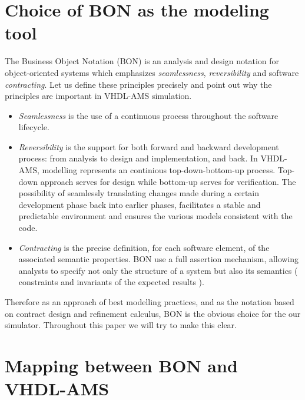 \documentclass{article}
\newcommand{\todo}{\textbf{TODO:}}
\begin{document}
\section{Choice of BON as the modeling tool}
The Business Object Notation (BON) is an analysis and design notation 
for object-oriented systems  which emphasizes \emph{seamlessness}, 
\emph{reversibility} and software \emph{contracting}. Let us define 
these principles precisely and point out why the principles are 
important in VHDL-AMS simulation.
\begin{itemize}
\item \emph{Seamlessness} is the use of a continuous process 
throughout the software lifecycle.
\item \emph{Reversibility} is the support for both forward and 
backward development process: from analysis to design 
and implementation, and back.
In VHDL-AMS, modelling represents an continious top-down-bottom-up
process. Top-down approach serves for design while bottom-up
serves for verification. The possibility of seamlessly translating 
changes made during a certain development phase back into earlier phases,
facilitates a stable and predictable environment and ensures the various 
models consistent with the code.
\item \emph{Contracting} is the precise definition, for each software element, 
of the associated semantic properties. BON use a full assertion mechanism, 
allowing analysts to specify not only the structure of a system but also its
semantics ( constraints and invariants of the expected results ).
\end{itemize}

Therefore as an approach of best modelling practices, and as the notation 
based on contract design and refinement calculus, BON is the obvious choice 
for the our simulator.
Throughout this paper we will try to make this clear.  
\section{Mapping between BON and VHDL-AMS}
\end{document}
